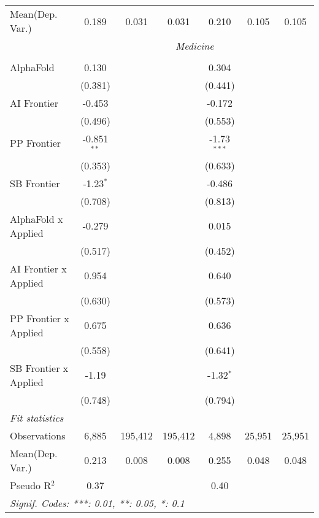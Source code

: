 \begin{tabular}{lcccccc}
Mean(Dep. Var.) & 0.189 & 0.031 & 0.031 & 0.210 & 0.105 & 0.105 \\
 & \multicolumn{6}{c}{\textit{Medicine}} \\ \\
   AlphaFold             & 0.130         &         &         & 0.304         &        &   \\   
                         & (0.381)       &         &         & (0.441)       &        &   \\   
   AI Frontier           & -0.453        &         &         & -0.172        &        &   \\   
                         & (0.496)       &         &         & (0.553)       &        &   \\   
   PP Frontier           & -0.851$^{**}$ &         &         & -1.73$^{***}$ &        &   \\   
                         & (0.353)       &         &         & (0.633)       &        &   \\   
   SB Frontier           & -1.23$^{*}$   &         &         & -0.486        &        &   \\   
                         & (0.708)       &         &         & (0.813)       &        &   \\   
   AlphaFold x Applied   & -0.279        &         &         & 0.015         &        &   \\   
                         & (0.517)       &         &         & (0.452)       &        &   \\   
   AI Frontier x Applied & 0.954         &         &         & 0.640         &        &   \\   
                         & (0.630)       &         &         & (0.573)       &        &   \\   
   PP Frontier x Applied & 0.675         &         &         & 0.636         &        &   \\   
                         & (0.558)       &         &         & (0.641)       &        &   \\   
   SB Frontier x Applied & -1.19         &         &         & -1.32$^{*}$   &        &   \\   
                         & (0.748)       &         &         & (0.794)       &        &   \\   
   \midrule
   \emph{Fit statistics}\\
   Observations          & 6,885         & 195,412 & 195,412 & 4,898         & 25,951 & 25,951\\  
Mean(Dep. Var.) & 0.213 & 0.008 & 0.008 & 0.255 & 0.048 & 0.048 \\
   Pseudo R$^2$          & 0.37          &         &         & 0.40          &        & \\  
   \midrule \midrule
   \multicolumn{7}{l}{\emph{Signif. Codes: ***: 0.01, **: 0.05, *: 0.1}}\\
\end{tabular}
\par\endgroup
